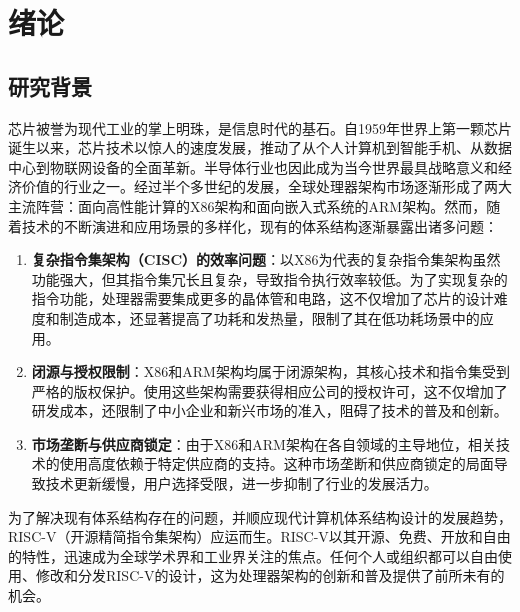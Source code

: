 
\clearpage
\setcounter{page}{1}

\chapter{绪论}

\section{研究背景}
芯片被誉为现代工业的掌上明珠，是信息时代的基石。自1959年世界上第一颗芯片诞生以来\cite{faggin1996history}，芯片技术以惊人的速度发展，推动了从个人计算机到智能手机、从数据中心到物联网设备的全面革新。半导体行业也因此成为当今世界最具战略意义和经济价值的行业之一。经过半个多世纪的发展，全球处理器架构市场逐渐形成了两大主流阵营：面向高性能计算的X86架构和面向嵌入式系统的ARM架构。然而，随着技术的不断演进和应用场景的多样化，现有的体系结构逐渐暴露出诸多问题：

\begin{enumerate}[label={\arabic*)},itemsep=0pt, parsep=0pt]
	\item \textbf{复杂指令集架构（CISC）的效率问题}：以X86为代表的复杂指令集架构虽然功能强大，但其指令集冗长且复杂，导致指令执行效率较低。为了实现复杂的指令功能，处理器需要集成更多的晶体管和电路，这不仅增加了芯片的设计难度和制造成本，还显著提高了功耗和发热量，限制了其在低功耗场景中的应用。
	\item \textbf{闭源与授权限制}：X86和ARM架构均属于闭源架构，其核心技术和指令集受到严格的版权保护。使用这些架构需要获得相应公司的授权许可，这不仅增加了研发成本，还限制了中小企业和新兴市场的准入，阻碍了技术的普及和创新。
	\item \textbf{市场垄断与供应商锁定}：由于X86和ARM架构在各自领域的主导地位，相关技术的使用高度依赖于特定供应商的支持。这种市场垄断和供应商锁定的局面导致技术更新缓慢，用户选择受限，进一步抑制了行业的发展活力。
\end{enumerate}

为了解决现有体系结构存在的问题，并顺应现代计算机体系结构设计的发展趋势，RISC-V（开源精简指令集架构）应运而生。RISC-V以其开源、免费、开放和自由的特性，迅速成为全球学术界和工业界关注的焦点。任何个人或组织都可以自由使用、修改和分发RISC-V的设计，这为处理器架构的创新和普及提供了前所未有的机会。

